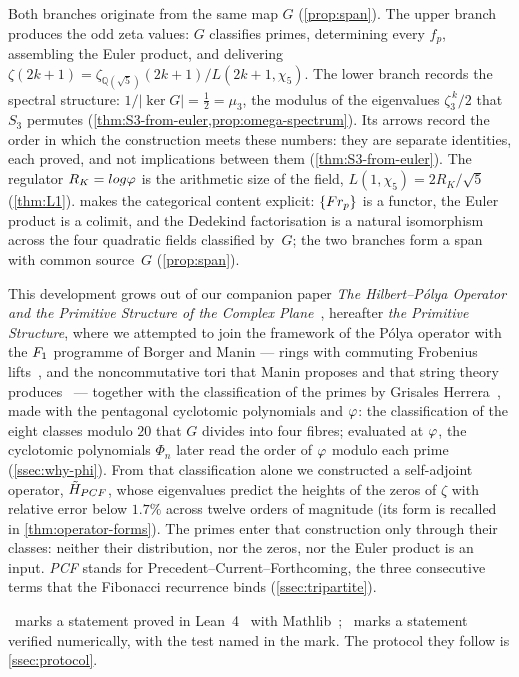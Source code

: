 Both branches originate from the same map $G$ (\cref{prop:span}).
The upper branch produces the odd zeta values: $G$ classifies
primes, determining every $f_p$, assembling the Euler product,
and delivering $\zeta(2k+1) = \zeta_{\mathbb{Q}(\sqrt{5})}(2k+1)/L(2k+1,\chi_5)$.
The lower branch records the spectral structure: $1/|\ker G|=\tfrac12=\mu_3$, the modulus of the eigenvalues
$\zeta_3^{\,k}/2$ that $S_3$ permutes (\cref{thm:S3-from-euler,prop:omega-spectrum}).  Its arrows record the
order in which the construction meets these numbers: they are separate identities, each proved, and not
implications between them (\cref{thm:S3-from-euler}).
The regulator $R_K = log\varphi$ is the arithmetic size of the field,
$L(1,\chi_5) = 2R_K/\sqrt{5}$ (\cref{thm:L1}).
 makes the categorical content
explicit: $\{Fr_p\}$ is a functor, the Euler product is a colimit, and
the Dedekind factorisation is a natural isomorphism across the four
quadratic fields classified by~$G$; the two branches form a span
with common source~$G$ (\cref{prop:span}).

This development grows out of our companion paper \emph{The Hilbert--P\'olya Operator and the
Primitive Structure of the Complex Plane}~\cite{gonzalez25hp}, hereafter \emph{the Primitive
Structure}, where we attempted to join the framework of the P\'olya operator with the $F_1$
programme of Borger and Manin --- rings with commuting Frobenius lifts~\cite{borger09}, and the
noncommutative tori that Manin proposes and that string theory produces~\cite{manin04,connes98} ---
together with the classification of the primes by Grisales Herrera~\cite{grisales25}, made with
the pentagonal cyclotomic polynomials and $\varphi$: the classification of the eight classes modulo $20$
that $G$ divides into four fibres; evaluated at $\varphi$, the cyclotomic polynomials $\Phi_n$ later
read the order of $\varphi$ modulo each prime (\cref{ssec:why-phi}).  From that classification alone we
constructed a self-adjoint operator, $\tilde H_{PCF}$, whose eigenvalues predict the heights of the zeros of
$\zeta$ with relative error below $1.7\%$ across twelve orders of magnitude (its form is recalled in
\cref{thm:operator-forms}).  The primes enter that construction only through their classes: neither their
distribution, nor the zeros, nor the Euler product is an input.  \emph{PCF} stands for
Precedent--Current--Forthcoming, the three consecutive terms that the Fibonacci recurrence binds
(\cref{ssec:tripartite}).

\leavevmode{}\ marks a statement proved in Lean~4~\cite{demoura21} with Mathlib~\cite{mathlib20};
\ marks a statement verified numerically, with the test named in the mark.  The protocol
they follow is \cref{ssec:protocol}.

